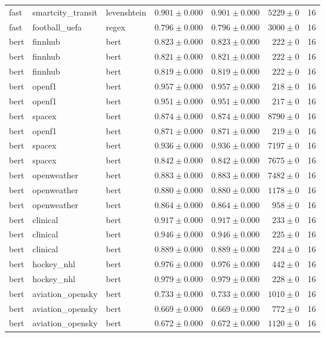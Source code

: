 \begin{table}[htbp]
\begin{tabular}{l l l r r r r}
fast & smartcity\_transit & levenshtein & $0.901\pm0.000$ & $0.901\pm0.000$ & $5229\pm0$ & 16 \\
fast & football\_uefa & regex & $0.796\pm0.000$ & $0.796\pm0.000$ & $3000\pm0$ & 16 \\
bert & finnhub & bert & $0.823\pm0.000$ & $0.823\pm0.000$ & $222\pm0$ & 16 \\
bert & finnhub & bert & $0.821\pm0.000$ & $0.821\pm0.000$ & $222\pm0$ & 16 \\
bert & finnhub & bert & $0.819\pm0.000$ & $0.819\pm0.000$ & $222\pm0$ & 16 \\
bert & openf1 & bert & $0.957\pm0.000$ & $0.957\pm0.000$ & $218\pm0$ & 16 \\
bert & openf1 & bert & $0.951\pm0.000$ & $0.951\pm0.000$ & $217\pm0$ & 16 \\
bert & spacex & bert & $0.874\pm0.000$ & $0.874\pm0.000$ & $8790\pm0$ & 16 \\
bert & openf1 & bert & $0.871\pm0.000$ & $0.871\pm0.000$ & $219\pm0$ & 16 \\
bert & spacex & bert & $0.936\pm0.000$ & $0.936\pm0.000$ & $7197\pm0$ & 16 \\
bert & spacex & bert & $0.842\pm0.000$ & $0.842\pm0.000$ & $7675\pm0$ & 16 \\
bert & openweather & bert & $0.883\pm0.000$ & $0.883\pm0.000$ & $7482\pm0$ & 16 \\
bert & openweather & bert & $0.880\pm0.000$ & $0.880\pm0.000$ & $1178\pm0$ & 16 \\
bert & openweather & bert & $0.864\pm0.000$ & $0.864\pm0.000$ & $958\pm0$ & 16 \\
bert & clinical & bert & $0.917\pm0.000$ & $0.917\pm0.000$ & $233\pm0$ & 16 \\
bert & clinical & bert & $0.946\pm0.000$ & $0.946\pm0.000$ & $225\pm0$ & 16 \\
bert & clinical & bert & $0.889\pm0.000$ & $0.889\pm0.000$ & $224\pm0$ & 16 \\
bert & hockey\_nhl & bert & $0.976\pm0.000$ & $0.976\pm0.000$ & $442\pm0$ & 16 \\
bert & hockey\_nhl & bert & $0.979\pm0.000$ & $0.979\pm0.000$ & $228\pm0$ & 16 \\
bert & aviation\_opensky & bert & $0.733\pm0.000$ & $0.733\pm0.000$ & $1010\pm0$ & 16 \\
bert & aviation\_opensky & bert & $0.669\pm0.000$ & $0.669\pm0.000$ & $772\pm0$ & 16 \\
bert & aviation\_opensky & bert & $0.672\pm0.000$ & $0.672\pm0.000$ & $1120\pm0$ & 16 \\

\end{tabular}
\end{table}
